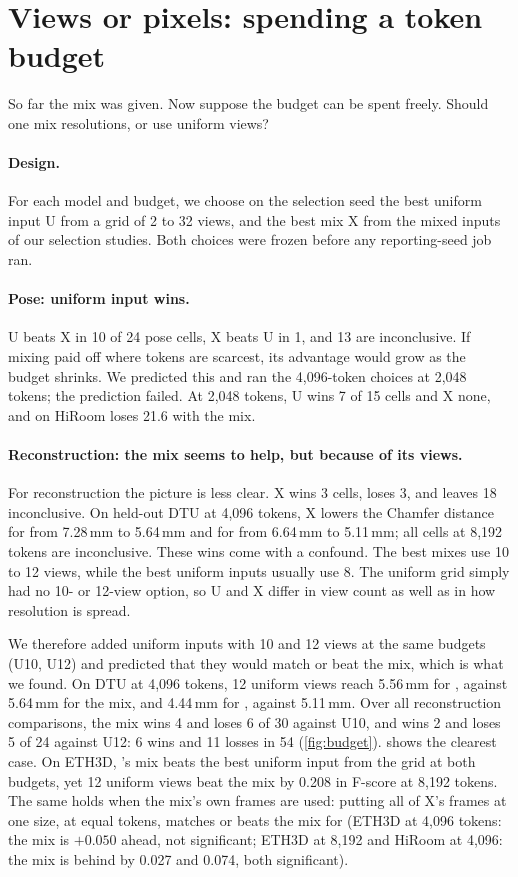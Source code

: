 \section{Views or pixels: spending a token budget}
\label{sec:budget}

So far the mix was given. Now suppose the budget can be spent freely. Should one mix resolutions, or use uniform views?

\paragraph{Design.}
For each model and budget, we choose on the selection seed the best uniform input U from a grid of 2 to 32 views, and the best mix X from the mixed inputs of our selection studies. Both choices were frozen before any reporting-seed job ran.

\paragraph{Pose: uniform input wins.}
U beats X in 10 of 24 pose cells, X beats U in 1, and 13 are inconclusive. If mixing paid off where tokens are scarcest, its advantage would grow as the budget shrinks. We predicted this and ran the 4{,}096-token choices at 2{,}048 tokens; the prediction failed. At 2{,}048 tokens, U wins 7 of 15 cells and X none, and on HiRoom \pithree loses 21.6 \auc with the mix.

\paragraph{Reconstruction: the mix seems to help, but because of its views.}
For reconstruction the picture is less clear. X wins 3 cells, loses 3, and leaves 18 inconclusive. On held-out DTU at 4{,}096 tokens, X lowers the Chamfer distance for \pithree from 7.28\,mm to 5.64\,mm and for \dathree from 6.64\,mm to 5.11\,mm; all cells at 8{,}192 tokens are inconclusive. These wins come with a confound. The best mixes use 10 to 12 views, while the best uniform inputs usually use 8. The uniform grid simply had no 10- or 12-view option, so U and X differ in view count as well as in how resolution is spread.

We therefore added uniform inputs with 10 and 12 views at the same budgets (U10, U12) and predicted that they would match or beat the mix, which is what we found. On DTU at 4{,}096 tokens, 12 uniform views reach 5.56\,mm for \pithree, against 5.64\,mm for the mix, and 4.44\,mm for \dathree, against 5.11\,mm. Over all reconstruction comparisons, the mix wins 4 and loses 6 of 30 against U10, and wins 2 and loses 5 of 24 against U12: 6 wins and 11 losses in 54 (\cref{fig:budget}).  shows the clearest case. On ETH3D, \pithree's mix beats the best uniform input from the grid at both budgets, yet 12 uniform views beat the mix by 0.208 in F-score at 8{,}192 tokens. The same holds when the mix's own frames are used: putting all of X's frames at one size, at equal tokens, matches or beats the mix for \pithree (ETH3D at 4{,}096 tokens: the mix is $+0.050$ ahead, not significant; ETH3D at 8{,}192 and HiRoom at 4{,}096: the mix is behind by 0.027 and 0.074, both significant).

